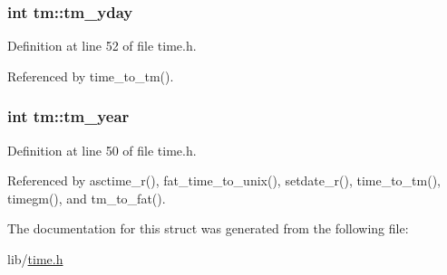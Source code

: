 \hypertarget{structtm_a93a0ba77cc23796df84405dcbcc57eb1}{
\subsubsection[{tm\-\_\-yday}]{\setlength{\rightskip}{0pt plus 5cm}int tm\-::tm\-\_\-yday}}\label{structtm_a93a0ba77cc23796df84405dcbcc57eb1}


Definition at line 52 of file time.\-h.



Referenced by time\-\_\-to\-\_\-tm().

\hypertarget{structtm_a33adf78fd6476b2120ce3b9c4a852053}{
\subsubsection[{tm\-\_\-year}]{\setlength{\rightskip}{0pt plus 5cm}int tm\-::tm\-\_\-year}}\label{structtm_a33adf78fd6476b2120ce3b9c4a852053}


Definition at line 50 of file time.\-h.



Referenced by asctime\-\_\-r(), fat\-\_\-time\-\_\-to\-\_\-unix(), setdate\-\_\-r(), time\-\_\-to\-\_\-tm(), timegm(), and tm\-\_\-to\-\_\-fat().



The documentation for this struct was generated from the following file\-:\begin{DoxyCompactItemize}
\item 
lib/\hyperlink{time_8h}{time.\-h}\end{DoxyCompactItemize}
